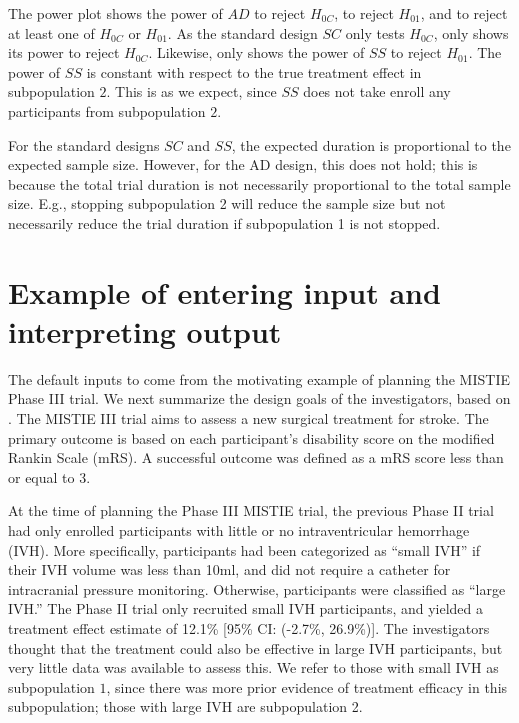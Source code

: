 \documentclass[article]{jss}
\begin{document}
The power plot shows the power of $AD$ to reject $H_{0C}$, to reject $H_{01}$, and to reject at least one of $H_{0C}$ or $H_{01}$. As the standard design $SC$ only tests $H_{0C}$,  only shows its power to reject $H_{0C}$. Likewise,  only shows the power of $SS$ to reject $H_{01}$. 
The power of $SS$ is constant with respect to the true treatment effect in subpopulation $2$. This is as we expect, since $SS$ does not take enroll any participants from subpopulation $2$. 

For the standard designs $SC$ and $SS$, the expected duration is proportional to the expected sample size. 
However, for the AD design, this does not hold; this is because the total trial duration is not necessarily proportional to the total sample size. E.g., stopping subpopulation 2 will reduce the sample size but not necessarily reduce the trial duration if subpopulation 1 is not stopped.

\section{Example of entering input and interpreting output}
\label{sec:example}

The default inputs to  come from the motivating example of planning the MISTIE Phase III trial. We next summarize the design goals of the investigators, based on \citep{Rosenblum2013AdaptMISTIE}. The MISTIE III trial aims to assess a new surgical treatment for stroke. The primary outcome is based on
 each participant's  disability score on the modified Rankin Scale (mRS). A successful outcome was defined as a mRS score less than or equal to 3. 

At the time of planning the Phase III MISTIE trial, the previous Phase II trial had only enrolled participants with little or no intraventricular hemorrhage (IVH). More specifically, participants had been categorized as ``small IVH'' if their IVH volume was less than 10ml, and did not require a catheter for intracranial pressure monitoring. Otherwise, participants were classified as ``large IVH.'' The Phase II trial only recruited small IVH participants, and yielded a treatment effect estimate of 12.1\% [95\% CI: (-2.7\%, 26.9\%)]. The investigators thought that the treatment could also be effective in large IVH participants, but very little data was available to assess this. We refer to those with small IVH as subpopulation $1$, since there was more prior evidence of treatment efficacy in this subpopulation; those with large IVH  are subpopulation 2.
\end{document}
